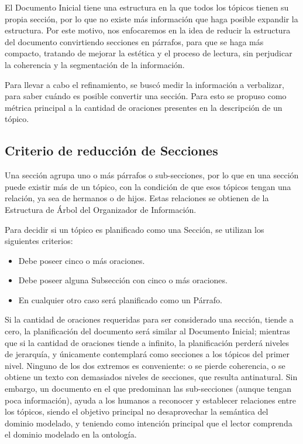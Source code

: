 El Documento Inicial tiene una estructura en la que todos los tópicos tienen su propia sección, por lo que no existe más información que haga posible expandir la estructura. Por este motivo, nos enfocaremos en la idea de reducir la estructura del documento convirtiendo secciones en párrafos, para que se haga más compacto, tratando de mejorar la estética y el proceso de lectura, sin perjudicar la coherencia y la segmentación de la información.

Para llevar a cabo el refinamiento, se buscó medir la información a verbalizar, para saber cuándo es posible convertir una sección. Para esto se propuso como métrica principal a la cantidad de oraciones presentes en la descripción de un tópico.

\subsection{Criterio de reducción de Secciones}
Una sección agrupa uno o más párrafos o sub-secciones, por lo que en una sección puede existir más de un tópico, con la condición de que esos tópicos tengan una relación, ya sea de hermanos o de hijos. Estas relaciones se obtienen de la Estructura de Árbol del Organizador de Información. 

Para decidir si un tópico es planificado como una Sección, se utilizan los siguientes criterios:
\begin{itemize}
    \item Debe poseer cinco o más oraciones.
    \item Debe poseer alguna Subsección con cinco o más oraciones.
    \item En cualquier otro caso será planificado como un Párrafo.
\end{itemize}

Si la cantidad de oraciones requeridas para ser considerado una sección, tiende a cero, la planificación del documento será similar al Documento Inicial; mientras que si la cantidad de oraciones tiende a infinito, la planificación perderá niveles de jerarquía, y únicamente contemplará como secciones a los tópicos del primer nivel. Ninguno de los dos extremos es conveniente: o se pierde coherencia, o se obtiene un texto con demasiados niveles de secciones, que resulta antinatural. Sin embargo, un documento en el que predominan las sub-secciones (aunque tengan poca información), ayuda a los humanos a reconocer y establecer relaciones entre los tópicos, siendo el objetivo principal no desaprovechar la semántica del dominio modelado, y teniendo como intención principal que el lector comprenda el dominio modelado en la ontología.

